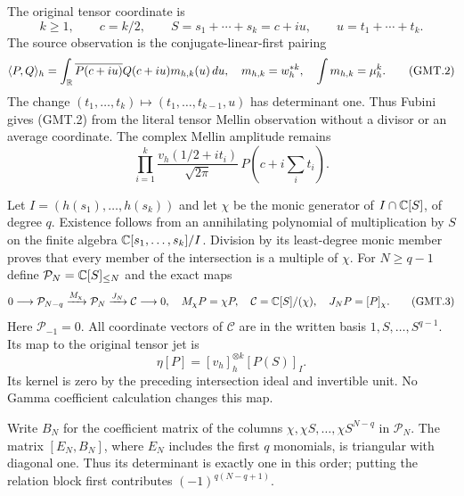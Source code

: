 The original tensor coordinate is
\[
 k\ge1,\qquad c=k/2,\qquad S=s_1+\cdots+s_k=c+iu,
 \qquad u=t_1+\cdots+t_k.                                      \tag{GMT.1}
\]
The source observation is the conjugate-linear-first pairing
\[
 \langle P,Q\rangle_h=\int_\mathbb R
       \overline{P(c+iu)}Q(c+iu)m_{h,k}(u)\,du,
 \quad m_{h,k}=w_h^{*k},\quad\int m_{h,k}=\mu_h^k.                \tag{GMT.2}
\]
The change $(t_1,\ldots,t_k)\mapsto
(t_1,\ldots,t_{k-1},u)$ has determinant one. Thus Fubini gives (GMT.2)
from the literal tensor Mellin observation without a divisor or an
average coordinate. The complex Mellin amplitude remains
\[
 \prod_{i=1}^k\frac{v_h(1/2+it_i)}{\sqrt{2\pi}}\,
 P(c+i\textstyle\sum_i t_i).
\]

Let $I=(h(s_1),\ldots,h(s_k))$ and let $\chi$ be the monic generator
of $I\cap\mathbb C[S]$, of degree $q$. Existence follows from an annihilating
polynomial of multiplication by $S$ on the finite algebra
$\mathbb C[s_1,\ldots,s_k]/I$. Division by its least-degree monic member
proves that every member of the intersection is a multiple of $\chi$.
For $N\ge q-1$ define $\mathcal P_N=\mathbb C[S]_{\le N}$ and the exact maps
\[
 0\longrightarrow\mathcal P_{N-q}
 \xrightarrow{M_\chi}\mathcal P_N
 \xrightarrow{J_N}\mathcal C\longrightarrow0,
 \quad M_\chi P=\chi P,\quad
 \mathcal C=\mathbb C[S]/(\chi),\quad J_NP=[P]_\chi.                   \tag{GMT.3}
\]
Here $\mathcal P_{-1}=0$. All coordinate vectors of $\mathcal C$ are
in the written basis $1,S,\ldots,S^{q-1}$. Its map to the original
tensor jet is
\[
 \eta[P]=[v_h]_h^{\otimes k}[P(S)]_I.
\]
Its kernel is zero by the preceding intersection ideal and invertible
unit. No Gamma coefficient calculation changes this map.

Write $B_N$ for the coefficient matrix of the columns
$\chi,\chi S,\ldots,\chi S^{N-q}$ in $\mathcal P_N$. The matrix
$[E_N,B_N]$, where $E_N$ includes the first $q$ monomials, is triangular
with diagonal one. Thus its determinant is exactly one in this order;
putting the relation block first contributes $(-1)^{q(N-q+1)}$.

